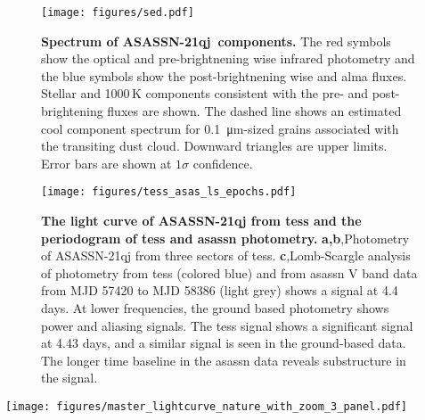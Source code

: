 \documentclass[sn-nature,oneside]{sn-jnl}%
\newcommand{\asas}{ASASSN-21qj}
\begin{document}
\begin{figure}[h!]
    \centering
\texttt{[image: figures/sed.pdf]}
    \caption{\textbf{Spectrum of \asas{}~components.} The red symbols show the optical and pre-brightnening \gls{wise} infrared photometry and the blue symbols show the post-brightnening \gls{wise} and \gls{alma} fluxes. Stellar and 1000\,K components consistent with the pre- and post-brightening fluxes are shown. The dashed line shows an estimated cool component spectrum for \SI{0.1}{\micro\metre}-sized grains associated with the transiting dust cloud. Downward triangles are upper limits.
    Error bars are shown at $1\sigma$ confidence.
}
    \label{fig:sed}
\end{figure}
%


\begin{figure}
   \begin{centering}
\texttt{[image: figures/tess\_asas\_ls\_epochs.pdf]}
      \caption{\textbf{The light curve of ASASSN-21qj from \gls{tess} and the periodogram of \gls{tess} and \gls{asassn} photometry.}
      {\bf a,b},Photometry of ASASSN-21qj from three sectors of \gls{tess}.
      {\bf c},Lomb-Scargle analysis of photometry from \gls{tess} (colored blue) and from \gls{asassn} V band data from MJD 57420 to MJD 58386 (light grey) shows a signal at 4.4 days.
      At lower frequencies, the ground based photometry shows power and aliasing signals.
      The \gls{tess} signal shows a significant signal at 4.43 days, and a similar signal is seen in the ground-based data.
      The longer time baseline in the \gls{asassn} data reveals substructure in the signal.}
        \label{fig:TESS_lc}
    \end{centering}
\end{figure}

\begin{figure*}
\begin{centering}
\texttt{[image: figures/master\_lightcurve\_nature\_with\_zoom\_3\_panel.pdf]}
      \caption{\textbf{Deriving the transverse velocity from a light curve.}
      {\bf a},\gls{asassn} $g'$ photometry is shown in units of normalised flux.
      Straight line fits (light-blue lines) are made to the photometry in the regions indicated by the light-grey vertical lines.
      {\bf b},Gradient of the light curve as a function of time.
      {\bf c},Transverse velocity derived from the light curve and the gradient of the light curve.
      Error bars are shown at $1\sigma$ confidence.
}
        \label{fig:gradientconvert}

\end{centering}
\end{figure*}
\end{document}
